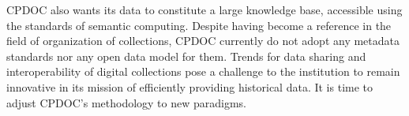    
CPDOC also wants its data to constitute a large knowledge base,
accessible using the standards of semantic computing. Despite having
become a reference in the field of organization of collections, CPDOC
currently do not adopt any metadata standards nor any open data model
for them. Trends for data sharing and interoperability of digital
collections pose a challenge to the institution to remain innovative
in its mission of efficiently providing historical data. It is time to
adjust CPDOC's methodology to new paradigms.
   

      
